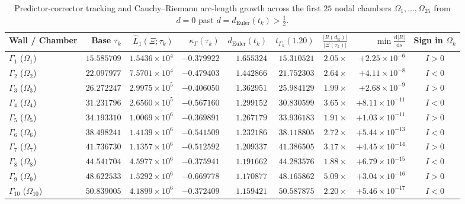 \documentclass[11pt,a4paper,reqno]{amsart}
\theoremstyle{definition}
\theoremstyle{remark}
\numberwithin{equation}{section}
\newcommand{\dd}{\mathrm{d}}
\begin{document}
\begin{table}[htbp]
\centering
\caption{Predictor-corrector tracking and Cauchy--Riemann arc-length growth across the first $25$ nodal chambers $\Omega_1, \dots, \Omega_{25}$ from $d = 0$ past $d = d_{\mathrm{Euler}}(t_k) > \frac{1}{2}$.}\label{tab:chambers_25}
\scriptsize
\setlength{\tabcolsep}{2.4pt}
\begin{tabular}{lrrrrrrrc}
\toprule
\textbf{Wall / Chamber} & \textbf{Base $\tau_k$} & \textbf{$\widehat{L}_1(\Xi;\tau_k)$} & \textbf{$\kappa_\Gamma(\tau_k)$} & \textbf{$d_{\mathrm{Euler}}(t_k)$} & \textbf{$t_{\Gamma_k}(1.20)$} & \textbf{$\frac{|R(d_{\mathrm{E}})|}{|\Xi(\tau_k)|}$} & \textbf{$\min \frac{\dd|R|}{\dd s}$} & \textbf{Sign in $\Omega_k$} \\
\midrule
$\Gamma_1$ ($\Omega_1$)   & $15.585709$ & $1.5436 \times 10^4$ & $-0.379922$ & $1.655324$ & $15.310521$ & $2.05\times$ & $+2.25 \times 10^{-6}$  & $I > 0$ \\
$\Gamma_2$ ($\Omega_2$)   & $22.097977$ & $7.5701 \times 10^4$ & $-0.479403$ & $1.442866$ & $21.752303$ & $2.64\times$ & $+4.11 \times 10^{-8}$  & $I < 0$ \\
$\Gamma_3$ ($\Omega_3$)   & $26.272247$ & $2.9975 \times 10^5$ & $-0.406050$ & $1.362951$ & $25.984129$ & $1.99\times$ & $+2.68 \times 10^{-9}$  & $I > 0$ \\
$\Gamma_4$ ($\Omega_4$)   & $31.231796$ & $2.6560 \times 10^5$ & $-0.567160$ & $1.299152$ & $30.830599$ & $3.65\times$ & $+8.11 \times 10^{-11}$ & $I < 0$ \\
$\Gamma_5$ ($\Omega_5$)   & $34.193310$ & $1.0069 \times 10^6$ & $-0.369891$ & $1.267179$ & $33.936183$ & $1.91\times$ & $+1.03 \times 10^{-11}$ & $I > 0$ \\
$\Gamma_6$ ($\Omega_6$)   & $38.498241$ & $1.4139 \times 10^6$ & $-0.541509$ & $1.232186$ & $38.118805$ & $2.72\times$ & $+5.44 \times 10^{-13}$ & $I < 0$ \\
$\Gamma_7$ ($\Omega_7$)   & $41.736730$ & $1.1357 \times 10^6$ & $-0.512592$ & $1.209337$ & $41.386505$ & $3.17\times$ & $+4.45 \times 10^{-14}$ & $I > 0$ \\
$\Gamma_8$ ($\Omega_8$)   & $44.541704$ & $4.5977 \times 10^6$ & $-0.375941$ & $1.191662$ & $44.283576$ & $1.88\times$ & $+6.79 \times 10^{-15}$ & $I < 0$ \\
$\Gamma_9$ ($\Omega_9$)   & $48.622533$ & $1.5292 \times 10^6$ & $-0.669778$ & $1.170877$ & $48.165862$ & $5.09\times$ & $+3.04 \times 10^{-16}$ & $I > 0$ \\
$\Gamma_{10}$ ($\Omega_{10}$) & $50.839005$ & $4.1899 \times 10^6$ & $-0.372409$ & $1.159421$ & $50.587875$ & $2.20\times$ & $+5.46 \times 10^{-17}$ & $I < 0$ \\

\end{tabular}
\end{table}
\end{document}
